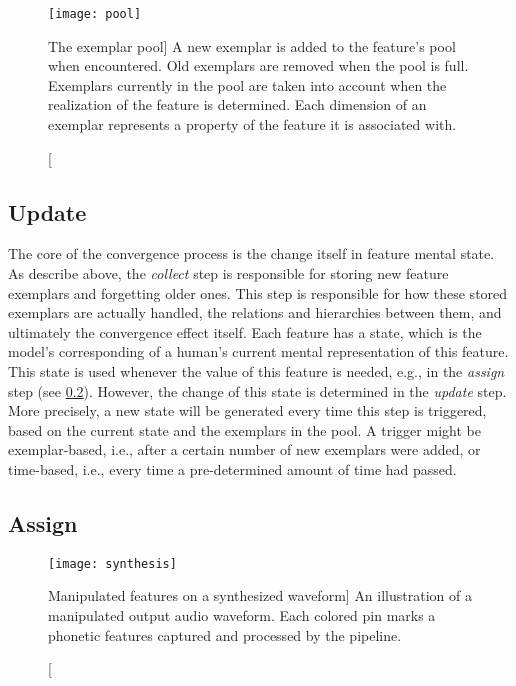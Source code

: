 \begin{figure}[t]
	\centering
	\texttt{[image: pool]}
	\caption
	[The exemplar pool]
	{A new exemplar is added to the feature's pool when encountered.
		Old exemplars are removed when the pool is full.
		Exemplars currently in the pool are taken into account when the realization of the feature is determined.
		Each dimension of an exemplar represents a property of the feature it is associated with.}
	\label{fig:exemplar_pool}
\end{figure}

\subsection{Update}
\label{subsec:update}

The core of the convergence process is the change itself in feature mental state.
As describe above, the \textit{collect} step is responsible for storing new feature exemplars and forgetting older ones.
This step is responsible for how these stored exemplars are actually handled, the relations and hierarchies between them, and ultimately the convergence effect itself.
Each feature has a state, which is the model's corresponding of a human's current mental representation of this feature.
This state is used whenever the value of this feature is needed, e.g., in the \textit{assign} step (see \cref{subsec:assign}).
However, the change of this state is determined in the \textit{update} step.
More precisely, a new state will be generated every time this step is triggered, based on the current state and the exemplars in the pool.
A trigger might be exemplar-based, i.e., after a certain number of new exemplars were added, or time-based, i.e., every time a pre-determined amount of time had passed.

\subsection{Assign}
\label{subsec:assign}


\begin{figure}
	\centering
	\texttt{[image: synthesis]}
	\caption
	[Manipulated features on a synthesized waveform]
	{An illustration of a manipulated output audio waveform.
		Each colored pin marks a phonetic features captured and processed by the pipeline.}
	\label{fig:adapted_synthesis_output}
\end{figure}

